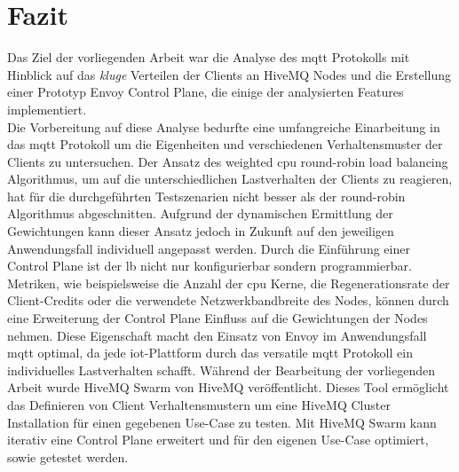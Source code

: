 \section{Fazit}
Das Ziel der vorliegenden Arbeit war die Analyse des \ac{mqtt} Protokolls mit Hinblick auf das \textit{kluge} Verteilen der Clients an HiveMQ Nodes und die Erstellung einer Prototyp Envoy Control Plane, die einige der analysierten Features implementiert.
\\
Die Vorbereitung auf diese Analyse bedurfte eine umfangreiche Einarbeitung in das \ac{mqtt} Protokoll um die Eigenheiten und verschiedenen Verhaltensmuster der Clients zu untersuchen.
Der Ansatz des weighted \ac{cpu} round-robin load balancing Algorithmus, um auf die unterschiedlichen Lastverhalten der Clients zu reagieren, hat für die durchgeführten Testszenarien nicht besser als der round-robin Algorithmus abgeschnitten. Aufgrund der dynamischen Ermittlung der Gewichtungen kann dieser Ansatz jedoch in Zukunft auf den jeweiligen Anwendungsfall individuell angepasst werden.
Durch die Einführung einer Control Plane ist der \acl{lb} nicht nur konfigurierbar sondern programmierbar.
Metriken, wie beispielsweise die Anzahl der \ac{cpu} Kerne, die Regenerationsrate der Client-Credits oder die verwendete Netzwerkbandbreite des Nodes, können durch eine Erweiterung der Control Plane Einfluss auf die Gewichtungen der Nodes nehmen.
Diese Eigenschaft macht den Einsatz von Envoy im Anwendungsfall \ac{mqtt} optimal, da jede \ac{iot}-Plattform durch das versatile \ac{mqtt} Protokoll ein individuelles Lastverhalten schafft.
Während der Bearbeitung der vorliegenden Arbeit wurde HiveMQ Swarm von HiveMQ veröffentlicht. Dieses Tool ermöglicht das Definieren von Client Verhaltensmustern um eine HiveMQ Cluster Installation für einen gegebenen Use-Case zu testen.
Mit HiveMQ Swarm kann iterativ eine Control Plane erweitert und für den eigenen Use-Case optimiert, sowie getestet werden.

